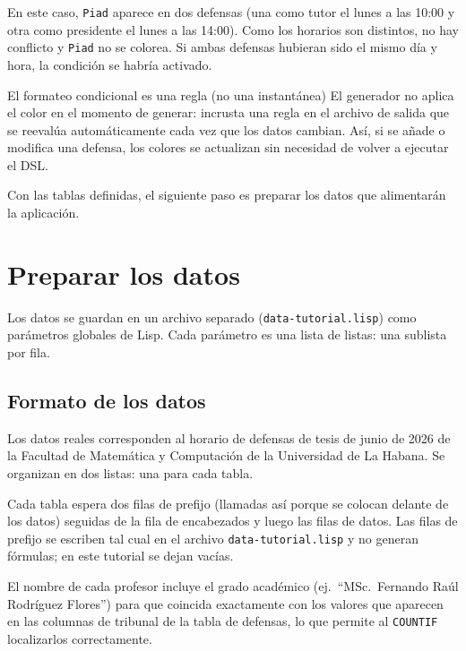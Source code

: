 \documentclass[12pt,a4paper]{report}
\begin{document}
En este caso, \texttt{Piad} aparece en dos defensas (una como tutor el
lunes a las 10:00 y otra como presidente el lunes a las 14:00).  Como
los horarios son distintos, no hay conflicto y \texttt{Piad} no se
colorea.  Si ambas defensas hubieran sido el mismo día y hora, la
condición se habría activado.

\begin{infobox}{El formateo condicional es una regla (no una instantánea)}
El generador no aplica el color en el momento de generar: incrusta una
regla en el archivo de salida que se reevalúa automáticamente cada vez que
los datos cambian.  Así, si se añade o modifica una defensa, los colores
se actualizan sin necesidad de volver a ejecutar el DSL.
\end{infobox}

Con las tablas definidas, el siguiente paso es preparar los datos que
alimentarán la aplicación.

\section{Preparar los datos}
\label{sec:datos}

Los datos se guardan en un archivo separado (\texttt{data-tutorial.lisp})
como parámetros globales de Lisp.  Cada parámetro es una lista de listas:
una sublista por fila.

\subsection{Formato de los datos}

Los datos reales corresponden al horario de defensas de tesis de junio
de 2026 de la Facultad de Matemática y Computación de la Universidad de
La Habana.  Se organizan en dos listas: una para cada tabla.

Cada tabla espera dos filas de prefijo (llamadas así porque se colocan
delante de los datos) seguidas de la fila de encabezados y luego las
filas de datos.  Las filas de prefijo se escriben tal cual en el archivo
\texttt{data-tutorial.lisp} y no generan fórmulas; en este tutorial se
dejan vacías.

El nombre de cada profesor incluye el grado académico (ej.\ ``MSc.\ Fernando
Raúl Rodríguez Flores'') para que coincida exactamente con los valores
que aparecen en las columnas de tribunal de la tabla de defensas, lo que
permite al \texttt{COUNTIF} localizarlos correctamente.
\end{document}
